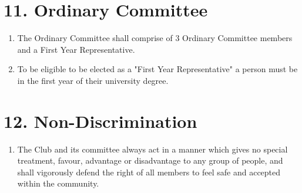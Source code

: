 \documentclass[12pt]{article}
\begin{document}
\section{11. Ordinary Committee}
\begin{enumerate}[label=11.\arabic*]
 \item The Ordinary Committee shall comprise of 3 Ordinary Committee members and a First Year Representative.
 \item To be eligible to be elected as a "First Year Representative" a person must be in the first year of their university degree.
\end{enumerate}

\section{12. Non-Discrimination}
\begin{enumerate}[label=12.\arabic*]
 \item The Club and its committee always act in a manner which gives no special treatment, favour, advantage or disadvantage to any group of people, and shall vigorously defend the right of all members to feel safe and accepted within the community.
\end{enumerate}
\end{document}
